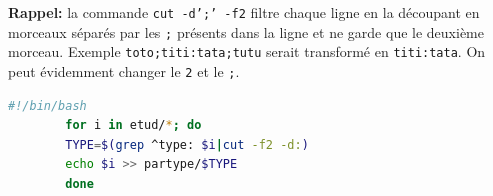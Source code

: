 \documentclass[a4paper]{iutvexam}
\begin{document}
\begin{questions}
\begin{parts}
    \textbf{Rappel:} la commande \texttt{cut -d';' -f2} filtre chaque ligne en la
    découpant en morceaux séparés par les \texttt{;} présents dans la
    ligne et ne garde que le deuxième morceau. Exemple
    \texttt{toto;titi:tata;tutu} serait transformé en
    \texttt{titi:tata}. On peut évidemment changer le \texttt{2} et le
    \texttt{;}.

    \begin{solutionordottedlines}[2in]%
      \begin{lstlisting}[language=bash,caption={bash}]
        #!/bin/bash
        for i in etud/*; do
        TYPE=$(grep ^type: $i|cut -f2 -d:)
        echo $i >> partype/$TYPE
        done
      \end{lstlisting}
    \end{solutionordottedlines}

  \end{parts}
\end{questions}
\end{document}
